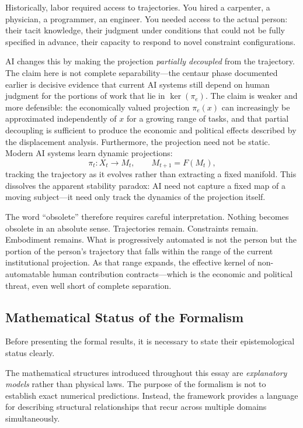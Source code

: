 \documentclass[12pt, a4paper]{article}
\theoremstyle{plain}
\theoremstyle{definition}
\theoremstyle{remark}
\begin{document}
Historically, labor required access to trajectories.
You hired a carpenter, a physician, a programmer, an engineer.
You needed access to the actual person: their tacit knowledge, their judgment
under conditions that could not be fully specified in advance, their capacity
to respond to novel constraint configurations.

AI changes this by making the projection \emph{partially decoupled} from the trajectory.
The claim here is not complete separability---the centaur phase documented earlier
is decisive evidence that current AI systems still depend on human judgment for
the portions of work that lie in $\ker(\pi_e)$.
The claim is weaker and more defensible: the economically valued projection
$\pi_e(x)$ can increasingly be approximated independently of $x$ for a growing
range of tasks, and that partial decoupling is sufficient to produce the economic
and political effects described by the displacement analysis.
Furthermore, the projection need not be static.
Modern AI systems learn dynamic projections:
\[
\pi_t : X_t \to M_t, \qquad M_{t+1} = F(M_t),
\]
tracking the trajectory as it evolves rather than extracting a fixed manifold.
This dissolves the apparent stability paradox: AI need not capture a fixed map of
a moving subject---it need only track the dynamics of the projection itself.

The word ``obsolete'' therefore requires careful interpretation.
Nothing becomes obsolete in an absolute sense.
Trajectories remain. Constraints remain. Embodiment remains.
What is progressively automated is not the person but the portion of the person's
trajectory that falls within the range of the current institutional projection.
As that range expands, the effective kernel of non-automatable human contribution
contracts---which is the economic and political threat, even well short of complete separation.

\subsection*{Mathematical Status of the Formalism}

Before presenting the formal results, it is necessary to state their epistemological
status clearly.

The mathematical structures introduced throughout this essay are \emph{explanatory
models} rather than physical laws.
The purpose of the formalism is not to establish exact numerical predictions.
Instead, the framework provides a language for describing structural relationships
that recur across multiple domains simultaneously.
\end{document}
